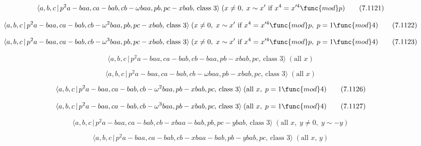 \documentclass[10pt]{article}
\begin{document}
\begin{equation}
\langle a,b,c\,|\,p^{2}a-baa,ca-bab,cb-\omega baa,pb,pc-xbab,\,\text{class }%
3\rangle \;(x\neq 0,\;x\sim x^{\prime }\text{ if }x^{4}=x^{\prime 4}\func{mod%
}p)  \tag{7.1121}
\end{equation}

\begin{equation}
\langle a,b,c\,|\,p^{2}a-baa,ca-bab,cb-\omega ^{2}baa,pb,pc-xbab,\,\text{%
class }3\rangle \;(x\neq 0,\;x\sim x^{\prime }\text{ if }x^{4}=x^{\prime 4}%
\func{mod}p,\;p=1\func{mod}4)  \tag{7.1122}
\end{equation}

\begin{equation}
\langle a,b,c\,|\,p^{2}a-baa,ca-bab,cb-\omega ^{3}baa,pb,pc-xbab,\,\text{%
class }3\rangle \;(x\neq 0,\;x\sim x^{\prime }\text{ if }x^{4}=x^{\prime 4}%
\func{mod}p,\;p=1\func{mod}4)  \tag{7.1123}
\end{equation}

\begin{equation}
\langle a,b,c\,|\,p^2a-baa,ca-bab,cb-baa,pb-xbab,pc,\,\text{class }3\rangle
\;(\text{all }x)  \tag{7.1124}
\end{equation}

\begin{equation}
\langle a,b,c\,|\,p^{2}a-baa,ca-bab,cb-\omega baa,pb-xbab,pc,\,\text{class }%
3\rangle \;(\text{all }x)  \tag{7.1125}
\end{equation}

\begin{equation}
\langle a,b,c\,|\,p^{2}a-baa,ca-bab,cb-\omega ^{2}baa,pb-xbab,pc,\,\text{%
class }3\rangle \;(\text{all }x,\;p=1\func{mod}4)  \tag{7.1126}
\end{equation}

\begin{equation}
\langle a,b,c\,|\,p^{2}a-baa,ca-bab,cb-\omega ^{3}baa,pb-xbab,pc,\,\text{%
class }3\rangle \;(\text{all }x,\;p=1\func{mod}4)  \tag{7.1127}
\end{equation}

\begin{equation}
\langle a,b,c\,|\,p^{2}a-baa,ca-bab,cb-xbaa-bab,pb,pc-ybab,\,\text{class }%
3\rangle \;(\text{all }x,\;y\neq 0,\;y\sim -y)  \tag{7.1128}
\end{equation}

\begin{equation}
\langle a,b,c\,|\,p^{2}a-baa,ca-bab,cb-xbaa-bab,pb-ybab,pc,\,\text{class }%
3\rangle \;(\text{all }x,\,y)  \tag{7.1129}
\end{equation}
\end{document}
